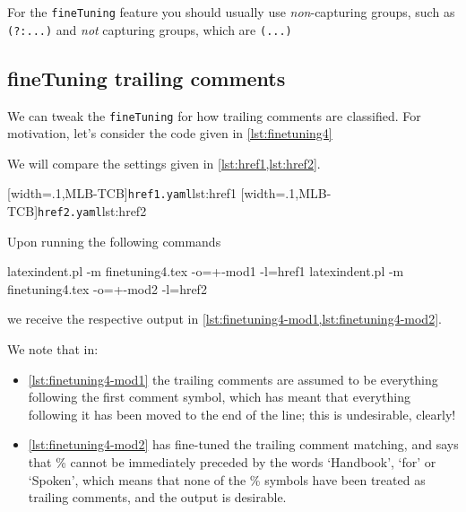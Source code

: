  \begin{warning}
  For the \texttt{fineTuning} feature you should usually use \emph{non}-capturing groups,
  such as \lstinline!(?:...)! and \emph{not} capturing groups, which are
  \lstinline!(...)!
 \end{warning}

\subsection{fineTuning trailing comments}
 \begin{example}
 We can tweak the \texttt{fineTuning} for how trailing comments are classified. For
 motivation, let's consider the code given in \cref{lst:finetuning4}


 We will compare the settings given in \cref{lst:href1,lst:href2}.

 \begin{cmhtcbraster}[raster columns=2,
   raster left skip=-3.5cm,
   raster right skip=-2cm,
   raster column skip=.03\linewidth]
  [width=.1\textwidth,MLB-TCB]{\texttt{href1.yaml}}{lst:href1}
  [width=.1\textwidth,MLB-TCB]{\texttt{href2.yaml}}{lst:href2}
 \end{cmhtcbraster}

 Upon running the following commands

 \begin{commandshell}
latexindent.pl -m finetuning4.tex -o=+-mod1 -l=href1
latexindent.pl -m finetuning4.tex -o=+-mod2 -l=href2
\end{commandshell}

 we receive the respective output in \cref{lst:finetuning4-mod1,lst:finetuning4-mod2}.

 \begin{widepage}

 \end{widepage}

 We note that in:
 \begin{itemize}
  \item \cref{lst:finetuning4-mod1} the trailing comments are assumed to be everything following
        the first comment symbol, which has meant that everything following it has been moved to
        the end of the line; this is undesirable, clearly!
  \item \cref{lst:finetuning4-mod2} has fine-tuned the trailing comment matching, and says that
        \% cannot
        be immediately preceded by the words `Handbook', `for' or `Spoken', which means that
        none of the \% symbols have been treated as trailing comments, and the output is
        desirable.
 \end{itemize}
 \end{example}

